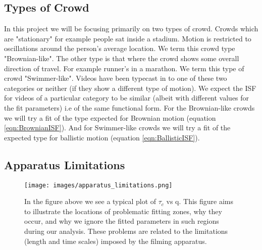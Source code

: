 \documentclass[11pt]{article}
\begin{document}
\subsection{Types of Crowd}
\label{section:crowdtypes}
In this project we will be focusing primarily on two types of crowd. Crowds which are "stationary" for example people sat inside a stadium. Motion is restricted to oscillations around the person's average location. We term this crowd type "Brownian-like". The other type is that where the crowd shows some overall direction of travel. For example runner's in a marathon. We term this type of crowd "Swimmer-like". Videos have been typecast in to one of these two categories or neither (if they show a different type of motion). We expect the ISF for videos of a particular category to be similar (albeit with different values for the fit parameters) i.e of the same functional form. For the Brownian-like crowds we will try a fit of the type expected for Brownian motion (equation \ref{eqn:BrownianISF}). And for Swimmer-like crowds we will try a fit of the expected type for ballistic motion (equation \ref{eqn:BallisticISF}).

\subsection{Apparatus Limitations}
\label{section:fitting_issues}
\begin{figure}[H]
\centering
\centerline{\texttt{[image: images/apparatus\_limitations.png]}}
\caption{
In the figure above we see a typical plot of $\tau_c$ vs  q. This figure aims to illustrate the locations of problematic fitting zones, why they occur, and why we ignore the fitted parameters in such regions during our analysis. These problems are related to the limitations (length and time scales) imposed by the filming apparatus.
}
\end{figure}
\end{document}
